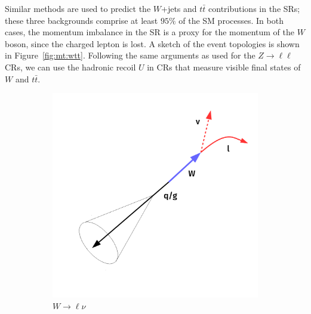 Similar methods are used to predict the $W$+jets and $t\bar{t}$ contributions in the SRs; these three backgrounds comprise at least $95\%$ of the SM processes.
In both cases, the momentum imbalance in the SR is a proxy for the momentum of the $W$ boson, since the charged lepton is lost.
A sketch of the event topologies is shown in Figure~\ref{fig:mt:wtt}.
Following the same arguments as used for the $Z\rightarrow\ell\ell$ CRs, we can use the hadronic recoil $U$ in CRs that measure visible final states of $W$ and $t\bar{t}$.

\begin{figure}[]
    \begin{center}
        \begin{subfigure}[t]{0.49\textwidth}
            \includegraphics[width=\textwidth]{figures/monotop/diagrams/wcr.pdf}
            \caption{$W\rightarrow\ell\nu$}
        \end{subfigure}
        \begin{subfigure}[t]{0.49\textwidth}

\end{subfigure}
\end{center}
\end{figure}
